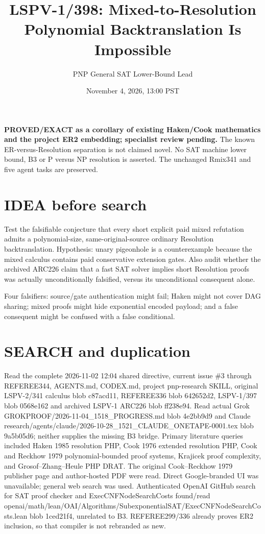 \documentclass[11pt]{article}
\title{LSPV-1/398: Mixed-to-Resolution Polynomial Backtranslation Is Impossible}
\author{PNP General SAT Lower-Bound Lead}
\date{November 4, 2026, 13:00 PST}
\begin{document}
\maketitle
\noindent\textbf{PROVED/EXACT as a corollary of existing Haken/Cook mathematics and the project ER2 embedding; specialist review pending.} The known ER-versus-Resolution separation is not claimed novel. No SAT machine lower bound, B3 or P versus NP resolution is asserted. The unchanged Rmix341 and five agent tasks are preserved.

\section*{IDEA before search}
Test the falsifiable conjecture that every short explicit paid mixed refutation admits a polynomial-size, same-original-source ordinary Resolution backtranslation. Hypothesis: unary pigeonhole is a counterexample because the mixed calculus contains paid conservative extension gates. Also audit whether the archived ARC226 claim that a fast SAT solver implies short Resolution proofs was actually unconditionally falsified, versus its unconditional consequent alone.

Four falsifiers: source/gate authentication might fail; Haken might not cover DAG sharing; mixed proofs might hide exponential encoded payload; and a false consequent might be confused with a false conditional.

\section*{SEARCH and duplication}
Read the complete 2026-11-02 12:04 shared directive, current issue \#3 through REFEREE344, AGENTS.md, CODEX.md, project pnp-research SKILL, original LSPV-2/341 calculus blob c87acd11, REFEREE336 blob 642652d2, LSPV-1/397 blob 0568e162 and archived LSPV-1 ARC226 blob ff238e94. Read actual Grok GROKPROOF/2026-11-04_1518_PROGRESS.md blob 4e2bb9d9 and Claude research/agents/claude/2026-10-28_1521_CLAUDE_ONETAPE-0001.tex blob 9a5b05d6; neither supplies the missing B3 bridge. Primary literature queries included Haken 1985 resolution PHP, Cook 1976 extended resolution PHP, Cook and Reckhow 1979 polynomial-bounded proof systems, Krajicek proof complexity, and Grosof--Zhang--Heule PHP DRAT. The original Cook--Reckhow 1979 publisher page and author-hosted PDF were read. Direct Google-branded UI was unavailable; general web search was used. Authenticated OpenAI GitHub search for SAT proof checker and ExecCNFNodeSearchCosts found/read openai/math/lean/OAI/Algorithms/SubexponentialSAT/ExecCNFNodeSearchCosts.lean blob 1ced21f4, unrelated to B3. REFEREE299/336 already proves ER2 inclusion, so that compiler is not rebranded as new.
\end{document}
